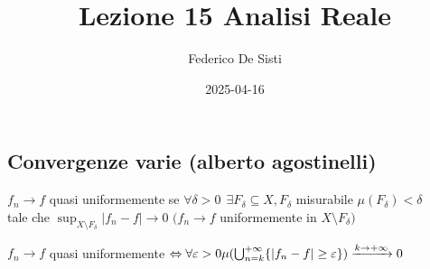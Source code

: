 \documentclass[12px]{article}
\title{Lezione 15 Analisi Reale}
\date{2025-04-16}
\author{Federico De Sisti}
\begin{document}
	\maketitle
	\newpage
	\subsection{Convergenze varie (alberto agostinelli)}
	\begin{defi}
		$f_n \rightarrow f$ quasi uniformemente se $\forall \delta > 0 \ \ \exists F_\delta\subseteq X, F_\delta$ misurabile  $\mu(F_\delta) < \delta$\\
	tale che   $\sup_{X\setminus F_\delta} |f_n - f| \rightarrow 0$ $(f_n \rightarrow f$ uniformemente in $X\setminus F_\delta)$
	\end{defi}
	\begin{prop}
		$f_n \rightarrow f$ quasi uniformemente $ \Leftrightarrow \forall \varepsilon > 0 \mu ( \bigcup^{+\infty}_{n = k}\{|f_n - f | \geq \varepsilon \}) \xrightarrow{ k \rightarrow + \infty} 0$
	\end{prop}
\end{document}
